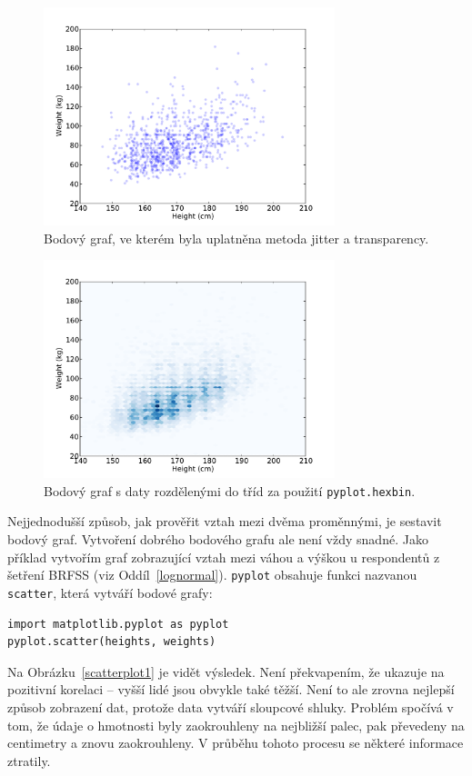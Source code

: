\documentclass[12pt]{book}
\begin{document}
\begin{figure}
\centerline{\includegraphics[height=2.5in]{figs/scatter3.pdf}}
\caption{Bodový graf, ve kterém byla uplatněna metoda jitter a transparency.}
\label{scatterplot3}
\end{figure}

\begin{figure}
\centerline{\includegraphics[height=2.5in]{figs/scatter4.pdf}}
\caption{Bodový graf s daty rozdělenými do tříd za použití {\tt pyplot.hexbin}.}
\label{scatterplot4}
\end{figure}

Nejjednodušší způsob, jak prověřit vztah mezi dvěma proměnnými, je sestavit bodový graf. Vytvoření dobrého bodového grafu ale není vždy snadné. Jako příklad vytvořím graf zobrazující vztah mezi váhou a výškou u respondentů z šetření BRFSS (viz Oddíl~\ref{lognormal}).  {\tt pyplot} obsahuje funkci nazvanou
{\tt scatter}, která vytváří bodové grafy:
%
\begin{verbatim}
import matplotlib.pyplot as pyplot
pyplot.scatter(heights, weights)
\end{verbatim}

Na Obrázku~\ref{scatterplot1} je vidět výsledek.  Není překvapením, že ukazuje na pozitivní korelaci -- vyšší lidé jsou obvykle také těžší. Není to ale zrovna nejlepší způsob zobrazení dat, protože data vytváří sloupcové shluky. Problém spočívá v tom, že údaje o hmotnosti byly zaokrouhleny na nejbližší palec, pak převedeny na centimetry a znovu zaokrouhleny. V průběhu tohoto procesu se některé informace ztratily.
\end{document}

